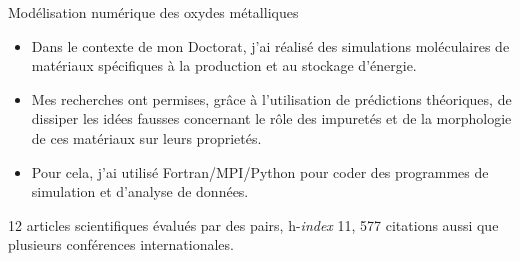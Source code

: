 \documentclass[10pt,a4paper,ragged2e,academicons]{altacv}
\begin{document}
\divider

Modélisation numérique des oxydes métalliques
\smallskip
\begin{itemize}
\justifying  
\item Dans le contexte de mon Doctorat, j'ai réalisé des simulations moléculaires de matériaux spécifiques à la production et au stockage d'énergie.
\item Mes recherches ont permises, grâce à l'utilisation de prédictions théoriques, de dissiper les idées fausses concernant le rôle des impuretés et de la morphologie de ces matériaux sur leurs proprietés. 
\item Pour cela, j'ai utilisé Fortran/MPI/Python pour coder des programmes de simulation et d'analyse de données.
\end{itemize}
{\small 12 articles scientifiques évalués par des pairs, h-\textit{index} 11, 577 citations aussi que plusieurs conférences internationales.}

\end{document}

